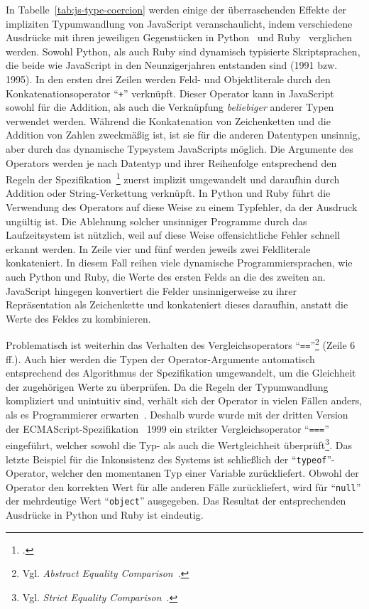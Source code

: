 In Tabelle~\ref{tab:js-type-coercion} werden einige der überraschenden Effekte der impliziten Typumwandlung von JavaScript veranschaulicht, indem verschiedene Ausdrücke mit ihren jeweiligen Gegenstücken in Python~\autocite{PYTHON3} und Ruby~\autocite{RUBY} verglichen werden. Sowohl Python, als auch Ruby sind dynamisch typisierte Skriptsprachen, die beide wie JavaScript in den Neunzigerjahren entstanden sind (1991 bzw. 1995).
In den ersten drei Zeilen werden Feld- und Objektliterale durch den Konkatenationsoperator \enquote{\texttt{+}} verknüpft. Dieser Operator kann in JavaScript sowohl für die Addition, als auch die Verknüpfung \emph{beliebiger} anderer Typen verwendet werden. Während die Konkatenation von Zeichenketten und die Addition von Zahlen zweckmäßig ist, ist sie für die anderen Datentypen unsinnig, aber durch das dynamische Typsystem JavaScripts möglich. Die Argumente des Operators werden je nach Datentyp und ihrer Reihenfolge entsprechend den Regeln der Spezifikation~\footcite[Abschn.~12.8.3]{ECMASCRIPT:2019} zuerst implizit umgewandelt und daraufhin durch Addition oder String-Verkettung verknüpft. In Python und Ruby führt die Verwendung des Operators auf diese Weise zu einem Typfehler, da der Ausdruck ungültig ist. Die Ablehnung solcher unsinniger Programme durch das Laufzeitsystem ist nützlich, weil auf diese Weise offensichtliche Fehler schnell erkannt werden.
In Zeile vier und fünf werden jeweils zwei Feldliterale konkateniert. In diesem Fall reihen viele dynamische Programmiersprachen, wie auch Python und Ruby, die Werte des ersten Felds an die des zweiten an. JavaScript hingegen konvertiert die Felder unsinnigerweise zu ihrer Repräsentation als Zeichenkette und konkateniert dieses daraufhin, anstatt die Werte des Feldes zu kombinieren.

\bigbreak


Problematisch ist weiterhin das Verhalten des Vergleichsoperators \enquote{\texttt{==}}\footnote{Vgl. \textit{Abstract Equality Comparison}~\autocite[Abschnitt 7.2.14]{ECMASCRIPT:2019}.} (Zeile 6 ff.). Auch hier werden die Typen der Operator-Argumente automatisch entsprechend des Algorithmus der Spezifikation umgewandelt, um die Gleichheit der zugehörigen Werte zu überprüfen. Da die Regeln der Typumwandlung kompliziert und unintuitiv sind, verhält sich der Operator in vielen Fällen anders, als es Programmierer erwarten~\autocite{PRADEL:2015}. Deshalb wurde wurde mit der dritten Version der ECMAScript-Spezifikation~\autocite{ECMASCRIPT:1999} 1999 ein strikter Vergleichsoperator \enquote{\texttt{===}} eingeführt, welcher sowohl die Typ- als auch die Wertgleichheit überprüft\footnote{Vgl. \textit{Strict Equality Comparison}~\autocite[Abschnitt 7.2.15]{ECMASCRIPT:2019}.}.
Das letzte Beispiel für die Inkonsistenz des Systems ist schließlich der \enquote{\texttt{typeof}}-Operator, welcher den momentanen Typ einer Variable zurückliefert. Obwohl der Operator den korrekten Wert für alle anderen Fälle zurückliefert, wird für \enquote{\texttt{null}} der mehrdeutige Wert \enquote{\texttt{object}} ausgegeben. Das Resultat der entsprechenden Ausdrücke in Python und Ruby ist eindeutig.

